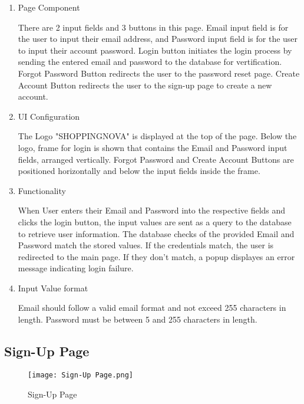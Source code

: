 \documentclass[conference]{IEEEtran}
\begin{document}
\begin{enumerate}
\setlength{\parindent}{2ex}
\setlength{\parskip}{0.5em}
\item Page Component

There are 2 input fields and 3 buttons in this page. Email input field is for the user to input their email address, and Password input field is for the user to input their account password. Login button initiates the login process by sending the entered email and password to the database for vertification. Forgot Password Button redirects the user to the password reset page. Create Account Button redirects the user to the sign-up page to create a new account.

\item UI Configuration

The Logo "SHOPPINGNOVA" is displayed at the top of the page. Below the logo, frame for login is shown that contains the Email and Password input fields, arranged vertically. Forgot Password and Create Account Buttons are positioned horizontally and below the input fields inside the frame. 

\item Functionality

When User enters their Email and Password into the respective fields and clicks the login button, the input values are sent as a query to the database to retrieve user information. The database checks of the provided Email and Password match the stored values. If the credentials match, the user is redirected to the main page. If they don't match, a popup displayes an error message indicating login failure. 

\item Input Value format

Email should follow a valid email format and not exceed 255 characters in length. 
Password must be between 5 and 255 characters in length.
\end{enumerate}

\subsection{Sign-Up Page}
\begin{figure}[H]
    \centering    
    \texttt{[image: Sign-Up Page.png]}
    \caption{Sign-Up Page}
    \label{fig:Sign-Up Page}
\end{figure}
\end{document}
